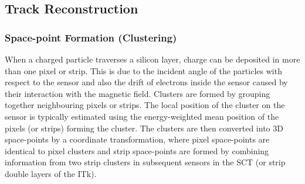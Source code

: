 \subsection{Track Reconstruction}
\label{track-reconstruction}




\subsubsection{Space-point Formation (Clustering)}
When a charged particle traverses a silicon layer, charge can be deposited in more than one pixel or strip. This is due to the incident angle of the particles with respect to the sensor and also the drift of electrons inside the sensor caused by their interaction with the magnetic field. Clusters are formed by grouping together neighbouring pixels or strips. The local position of the cluster on the sensor is typically estimated using the energy-weighted mean position of the pixels (or strips) forming the cluster. The clusters are then converted into 3D space-points by a coordinate transformation, where pixel space-points are identical to pixel clusters and strip space-points are formed by combining information from two strip clusters in subsequent sensors in the SCT (or strip double layers of the ITk).

